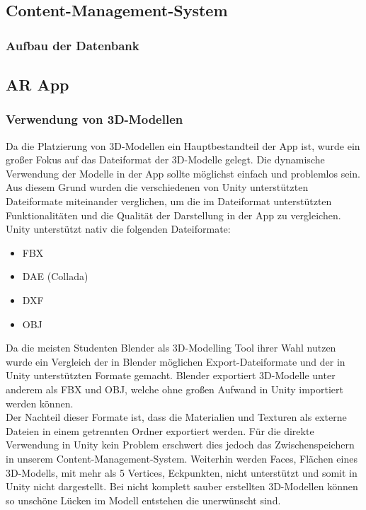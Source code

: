 \documentclass[titlepage, a4paper, 11pt]{scrartcl}
\begin{document}
  \subsection{Content-Management-System}
  \subsubsection{Aufbau der Datenbank}
  \subsection{AR App}
  \subsubsection{Verwendung von 3D-Modellen}
  Da die Platzierung von 3D-Modellen ein Hauptbestandteil der App ist, wurde ein großer Fokus auf das Dateiformat der 3D-Modelle gelegt. Die dynamische Verwendung der Modelle in der App sollte möglichst einfach und problemlos sein.\\ 
  Aus diesem Grund wurden die verschiedenen von Unity unterstützten Dateiformate miteinander verglichen, um die im Dateiformat unterstützten Funktionalitäten und die Qualität der Darstellung in der App zu vergleichen.\\
  Unity unterstützt nativ die folgenden Dateiformate:
  \begin{itemize}
  \item FBX
  \item DAE (Collada)
  \item DXF
  \item OBJ
  \end{itemize}
  Da die meisten Studenten Blender als 3D-Modelling Tool ihrer Wahl nutzen wurde ein Vergleich der in Blender möglichen Export-Dateiformate und der in Unity unterstützten Formate gemacht. Blender exportiert 3D-Modelle unter anderem als FBX und OBJ, welche ohne großen Aufwand in Unity importiert werden können.\\
  Der Nachteil dieser Formate ist, dass die Materialien und Texturen als externe Dateien in einem getrennten Ordner exportiert werden. Für die direkte Verwendung in Unity kein Problem erschwert dies jedoch das Zwischenspeichern in unserem Content-Management-System. Weiterhin werden \glqq Faces\grqq, Flächen eines 3D-Modells, mit mehr als 5 \glqq Vertices\grqq, Eckpunkten, nicht unterstützt und somit in Unity nicht dargestellt. Bei nicht komplett sauber erstellten 3D-Modellen können so unschöne Lücken im Modell entstehen die unerwünscht sind.\\
\end{document}
